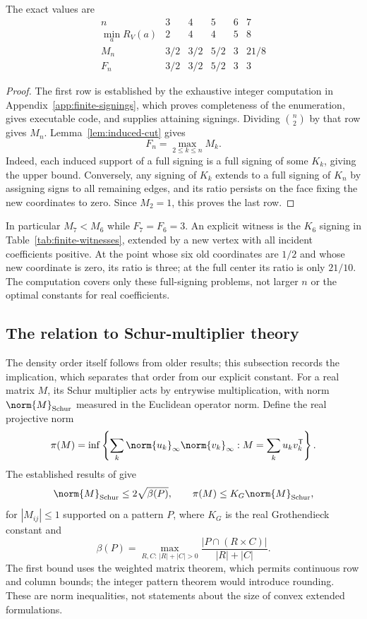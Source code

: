 \begin{proposition}\label{prop:finite-signings}
The exact values are
\[
\begin{array}{c|rrrrr}
 n&3&4&5&6&7\\\hline
 \min_a R_V(a)&2&4&4&5&8\\
 M_n&3/2&3/2&5/2&3&21/8\\
 F_n&3/2&3/2&5/2&3&3
\end{array}
\]
\end{proposition}
\begin{proof}
The first row is established by the exhaustive integer computation in
Appendix~\ref{app:finite-signings}, which proves completeness of the
enumeration, gives executable code, and supplies attaining signings.
Dividing $\binom n2$ by that row gives $M_n$.
Lemma~\ref{lem:induced-cut} gives
\[
 F_n=\max_{2\le k\le n} M_k.
\]
Indeed, each induced support of a full signing is a full signing of some
$K_k$, giving the upper bound. Conversely, any signing of $K_k$ extends
to a full signing of $K_n$ by assigning signs to all remaining edges,
and its ratio persists on the face fixing the new coordinates to zero.
Since $M_2=1$, this proves the last row.
\end{proof}

In particular $M_7<M_6$ while $F_7=F_6=3$. An explicit witness is the
$K_6$ signing in Table~\ref{tab:finite-witnesses}, extended by a new vertex
with all incident coefficients positive. At the point whose six old
coordinates are $1/2$ and whose new coordinate is zero, its ratio is three;
at the full center its ratio is only $21/10$. The computation covers only
these full-signing problems, not larger $n$
or the optimal constants for real coefficients.

\subsection{The relation to Schur-multiplier theory}\label{subsec:schur}
The density order itself follows from older results; this subsection
records the implication, which separates that order from our explicit
constant. For a real matrix $M$, its Schur multiplier
acts by entrywise multiplication, with norm $\norm{M}_{\mathrm{Schur}}$
measured in the Euclidean operator norm. Define the real projective norm
\[
 \pi(M)=\inf\left\{\sum_k\norm{u_k}_\infty\norm{v_k}_\infty:
                         M=\sum_k u_kv_k^{\mathsf T}\right\}.
\]
The established results of
\citet[Theorems 1.2 and 2.4]{DavidsonDonsig2007} give
\begin{equation}\label{eq:schur-input}
 \norm{M}_{\mathrm{Schur}}\le2\sqrt{\beta(P)},\qquad
 \pi(M)\le K_G\norm{M}_{\mathrm{Schur}},
\end{equation}
for $|M_{ij}|\le1$ supported on a pattern $P$, where $K_G$ is the real
Grothendieck constant and
\[
 \beta(P)=\max_{R,C:\,|R|+|C|>0}
             \frac{|P\cap(R\times C)|}{|R|+|C|}.
\]
The first bound uses the weighted matrix theorem, which permits continuous
row and column bounds; the integer pattern theorem would introduce rounding.
These are norm inequalities, not statements about the size of convex
extended formulations.

